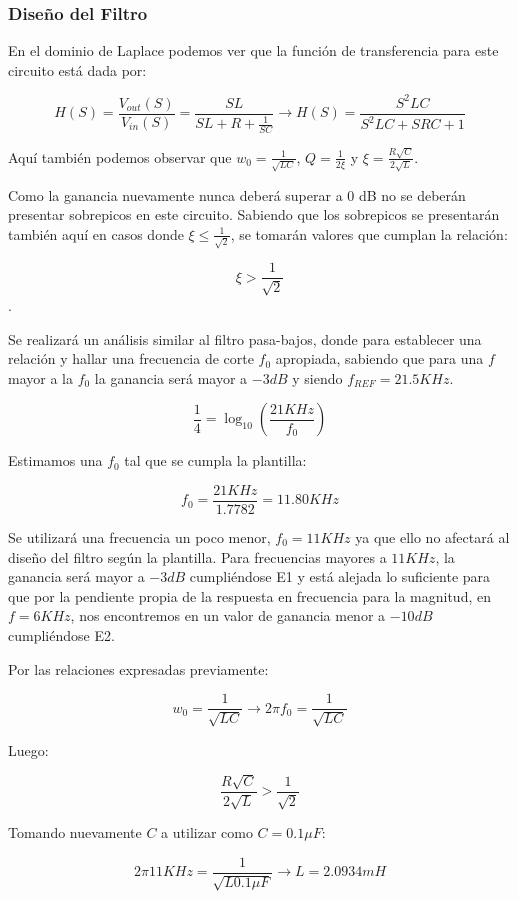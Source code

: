 \subsubsection{Diseño del Filtro}

En el dominio de Laplace podemos ver que la función de transferencia para este circuito está dada por:

$$H(S)=\frac{V_{out}(S)}{V_{in}(S)}=\frac{SL}{SL+R+\frac{1}{SC}} \longrightarrow H(S)=\frac{S^{2}LC}{S^2LC+SRC+1}$$

Aquí también podemos observar que $w_0=\frac{1}{\sqrt{LC}}$, $Q=\frac{1}{2\xi}$ y $\xi=\frac{R\sqrt{C}}{2\sqrt{L}}$.

Como la ganancia nuevamente nunca deberá superar a 0 dB no se deberán presentar sobrepicos en este circuito.
Sabiendo que los sobrepicos se presentarán también aquí en casos donde $\xi \leq \frac{1}{\sqrt{2}}$, se tomarán valores que cumplan la relación:

$$\xi > \frac{1}{\sqrt{2}}$$.

Se realizará un análisis similar al filtro pasa-bajos, donde para establecer una relación y hallar una frecuencia de corte $f_0$ apropiada, sabiendo que para una $f$
mayor a la $f_0$ la ganancia será mayor a $-3dB$ y siendo $f_{REF} = 21.5KHz$.


$$\frac{1}{4}=\log_{10}(\frac{21KHz}{f_0})$$

Estimamos una $f_0$ tal que se cumpla la plantilla:

$$f_0 = \frac{21KHz}{1.7782} = 11.80 KHz$$

Se utilizará una frecuencia un poco menor, $f_0=11 KHz$ ya que ello no afectará al diseño del filtro según la plantilla.
Para frecuencias mayores a $11 KHz$, la ganancia será mayor a $-3dB$ cumpliéndose E1 y está alejada lo suficiente para que por la pendiente
propia de la respuesta en frecuencia para la magnitud, en $f=6KHz$, nos encontremos en un valor de ganancia menor a $-10 dB$ cumpliéndose E2.

Por las relaciones expresadas previamente:

$$w_0=\frac{1}{\sqrt{LC}} \longrightarrow 2\pi f_0=\frac{1}{\sqrt{LC}}$$

Luego:

$$\frac{R\sqrt{C}}{2\sqrt{L}} > \frac{1}{\sqrt{2}}$$

Tomando nuevamente $C$ a utilizar como $C=0.1\mu F$: 

$$2\pi 11KHz=\frac{1}{\sqrt{L0.1 \mu F}} \longrightarrow L = 2.0934 mH$$

